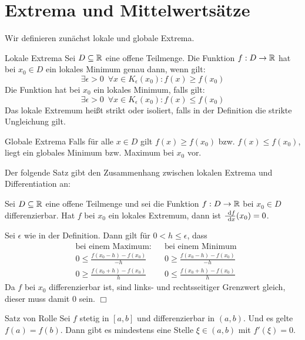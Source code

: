 \chapter{Extrema und Mittelwertsätze}
Wir definieren zunächst lokale und globale Extrema.

\begin{definition}{Lokale Extrema}
	Sei $D\subseteq\mathbb{R}$ eine offene Teilmenge.
	Die Funktion $f:D\rightarrow\mathbb{R}$ hat bei $x_0\in D$ ein lokales Minimum genau dann, wenn gilt:
	\begin{equation*}
		\exists \epsilon>0 \enspace\forall x\in K_\epsilon(x_0):f(x)\geq f(x_0)
	\end{equation*}
	Die Funktion hat bei $x_0$ ein lokales Minimum, falls gilt:
	\begin{equation*}
		\exists \epsilon>0 \enspace\forall x\in K_\epsilon(x_0):f(x)\leq f(x_0)
	\end{equation*}
	Das lokale Extremum heißt strikt oder isoliert, falls in der Definition die strikte Ungleichung gilt.
\end{definition}
\begin{definition}{Globale Extrema}
	Falls für alle $x\in D$ gilt $f(x)\geq f(x_0)$ bzw. $f(x)\leq f(x_0)$, liegt ein globales Minimum bzw. Maximum bei $x_0$ vor.
\end{definition}

Der folgende Satz gibt den Zusammenhang zwischen lokalen Extrema und Differentiation an:
\begin{satz}{}
	Sei $D\subseteq\mathbb{R}$ eine offene Teilmenge und sei die Funktion $f:D\rightarrow\mathbb{R}$ bei $x_0\in D$ differenzierbar. Hat $f$ bei $x_0$ ein lokales Extremum, dann ist $\frac{\ \operatorname{d}\! f}{\ \operatorname{d}\! x}(x_0)=0$.
\end{satz}
\begin{beweis}
	Sei $\epsilon$ wie in der Definition. Dann gilt für $0<h\leq\epsilon$, dass
	\begin{align*}
		&\text{bei einem Maximum:} &&\text{bei einem Minimum}\\
		&0\leq\frac{f(x_0-h)-f(x_0)}{-h} &&0\geq\frac{f(x_0-h)-f(x_0)}{-h}\\
		&0\geq\frac{f(x_0+h)-f(x_0)}{h} &&0\leq\frac{f(x_0+h)-f(x_0)}{h}
	\end{align*}
	Da $f$ bei $x_0$ differenzierbar ist, sind links- und rechtsseitiger Grenzwert gleich, dieser muss damit $0$ sein.
	\hfill$\Box$
\end{beweis}

\begin{satz}{Satz von Rolle}
Sei $f$ stetig in $[a,b]$ und differenzierbar in $(a,b)$. Und es gelte $f(a)=f(b)$. Dann gibt es mindestens eine Stelle $\xi \in(a,b)$ mit $f'(\xi)=0$.
\end{satz}

